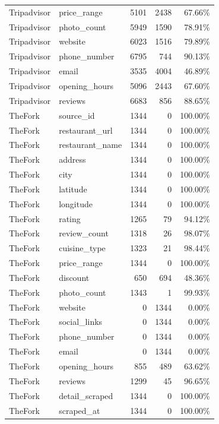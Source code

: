 {\begin{longtable}{llrrr}
Tripadvisor & price\_range & 5101 & 2438 & 67.66\% \\
Tripadvisor & photo\_count & 5949 & 1590 & 78.91\% \\
Tripadvisor & website & 6023 & 1516 & 79.89\% \\
Tripadvisor & phone\_number & 6795 & 744 & 90.13\% \\
Tripadvisor & email & 3535 & 4004 & 46.89\% \\
Tripadvisor & opening\_hours & 5096 & 2443 & 67.60\% \\
Tripadvisor & reviews & 6683 & 856 & 88.65\% \\
TheFork & source\_id & 1344 & 0 & 100.00\% \\
TheFork & restaurant\_url & 1344 & 0 & 100.00\% \\
TheFork & restaurant\_name & 1344 & 0 & 100.00\% \\
TheFork & address & 1344 & 0 & 100.00\% \\
TheFork & city & 1344 & 0 & 100.00\% \\
TheFork & latitude & 1344 & 0 & 100.00\% \\
TheFork & longitude & 1344 & 0 & 100.00\% \\
TheFork & rating & 1265 & 79 & 94.12\% \\
TheFork & review\_count & 1318 & 26 & 98.07\% \\
TheFork & cuisine\_type & 1323 & 21 & 98.44\% \\
TheFork & price\_range & 1344 & 0 & 100.00\% \\
TheFork & discount & 650 & 694 & 48.36\% \\
TheFork & photo\_count & 1343 & 1 & 99.93\% \\
TheFork & website & 0 & 1344 & 0.00\% \\
TheFork & social\_links & 0 & 1344 & 0.00\% \\
TheFork & phone\_number & 0 & 1344 & 0.00\% \\
TheFork & email & 0 & 1344 & 0.00\% \\
TheFork & opening\_hours & 855 & 489 & 63.62\% \\
TheFork & reviews & 1299 & 45 & 96.65\% \\
TheFork & detail\_scraped & 1344 & 0 & 100.00\% \\
TheFork & scraped\_at & 1344 & 0 & 100.00\% \\
\bottomrule
\end{longtable}
}
